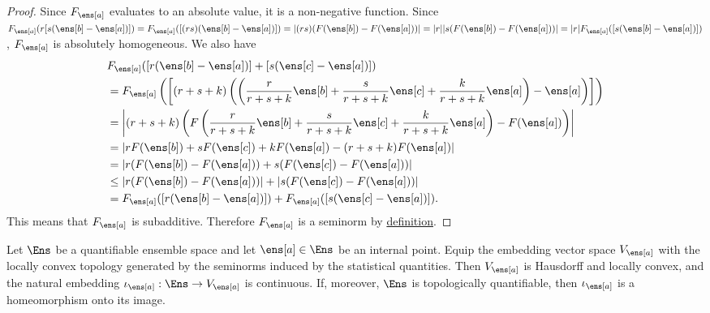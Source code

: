\begin{mathSection}
\begin{proof}
	Since $F_{\ens[a]}$ evaluates to an absolute value, it is a non-negative function. Since $F_{\ens[a]}(r[s(\ens[b]-\ens[a])]) = F_{\ens[a]}([(rs)(\ens[b]-\ens[a])]) = |(rs) (F(\ens[b]) - F(\ens[a]))| = |r| |s (F(\ens[b]) - F(\ens[a]))| = |r| F_{\ens[a]}([s(\ens[b]-\ens[a])])$, $F_{\ens[a]}$ is absolutely homogeneous. We also have
	\begin{equation}
	\begin{aligned}
		&F_{\ens[a]}([r(\ens[b]-\ens[a])] + [s(\ens[c]-\ens[a])])  \\
		&= F_{\ens[a]}\left(\left[(r+s+k) \left(\left(\frac{r}{r+s+k}\ens[b] + \frac{s}{r+s+k} \ens[c] +\frac{k}{r+s+k} \ens[a] \right) - \ens[a]\right)\right]\right) \\
		&= \left|(r+s+k)\left(F\left(\frac{r}{r+s+k}\ens[b] + \frac{s}{r+s+k} \ens[c] +\frac{k}{r+s+k} \ens[a]\right) - F(\ens[a]) \right)\right| \\
		&= \left|r F(\ens[b]) + s F(\ens[c]) + k F(\ens[a]) - (r+s+k) F(\ens[a]) \right| \\
		&= \left|r ( F(\ens[b]) - F(\ens[a]))  + s ( F(\ens[c]) - F(\ens[a])) \right| \\
		&\leq \left| r ( F(\ens[b]) - F(\ens[a])) \right| + \left| s ( F(\ens[c]) - F(\ens[a])) \right| \\
		&= F_{\ens[a]}([r(\ens[b]-\ens[a])]) + F_{\ens[a]}([s(\ens[c]-\ens[a])]).
	\end{aligned}
	\end{equation}
	This means that $F_{\ens[a]}$ is subadditive. Therefore $F_{\ens[a]}$ is a seminorm by \href{https://en.wikipedia.org/wiki/Seminorm}{definition}.
\end{proof}

\begin{prop}
	Let $\Ens$ be a quantifiable ensemble space and let $\ens[a]\in\Ens$ be an internal point. Equip the embedding vector space $V_{\ens[a]}$ with the locally convex topology generated by the seminorms induced by the statistical quantities. Then $V_{\ens[a]}$ is Hausdorff and locally convex, and the natural embedding $\iota_{\ens[a]}:\Ens\to V_{\ens[a]}$ is continuous. If, moreover, $\Ens$ is topologically quantifiable, then $\iota_{\ens[a]}$ is a homeomorphism onto its image.
\end{prop}


\end{mathSection}
